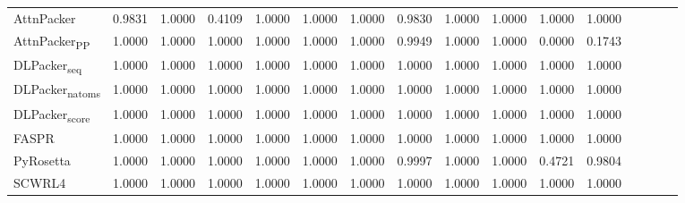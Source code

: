 \begin{table}
{\begin{tabular}{@{}lccccccccccccccc@{}}
                \textnormal{\hspace{0.5cm}AttnPacker} & 0.9831 & 1.0000 & 0.4109 & 1.0000 & 1.0000 & 1.0000 & 0.9830 & 1.0000 & 1.0000 & 1.0000 & 1.0000 \\
                \textnormal{\hspace{0.5cm}AttnPacker\textsubscript{PP}} & 1.0000 & 1.0000 & 1.0000 & 1.0000 & 1.0000 & 1.0000 & 0.9949 & 1.0000 & 1.0000 & 0.0000 & 0.1743 \\
                \textnormal{\hspace{0.5cm}DLPacker\textsubscript{seq}} & 1.0000 & 1.0000 & 1.0000 & 1.0000 & 1.0000 & 1.0000 & 1.0000 & 1.0000 & 1.0000 & 1.0000 & 1.0000 \\
                \textnormal{\hspace{0.5cm}DLPacker\textsubscript{natoms}} & 1.0000 & 1.0000 & 1.0000 & 1.0000 & 1.0000 & 1.0000 & 1.0000 & 1.0000 & 1.0000 & 1.0000 & 1.0000 \\
                \textnormal{\hspace{0.5cm}DLPacker\textsubscript{score}} & 1.0000 & 1.0000 & 1.0000 & 1.0000 & 1.0000 & 1.0000 & 1.0000 & 1.0000 & 1.0000 & 1.0000 & 1.0000 \\
                \textnormal{\hspace{0.5cm}FASPR} & 1.0000 & 1.0000 & 1.0000 & 1.0000 & 1.0000 & 1.0000 & 1.0000 & 1.0000 & 1.0000 & 1.0000 & 1.0000 \\
                \textnormal{\hspace{0.5cm}PyRosetta} & 1.0000 & 1.0000 & 1.0000 & 1.0000 & 1.0000 & 1.0000 & 0.9997 & 1.0000 & 1.0000 & 0.4721 & 0.9804 \\
                \textnormal{\hspace{0.5cm}SCWRL4} & 1.0000 & 1.0000 & 1.0000 & 1.0000 & 1.0000 & 1.0000 & 1.0000 & 1.0000 & 1.0000 & 1.0000 & 1.0000 \\
            \bottomrule
        \end{tabular}
    }
    \label{tab:casp15_p_values_table}
\end{table}